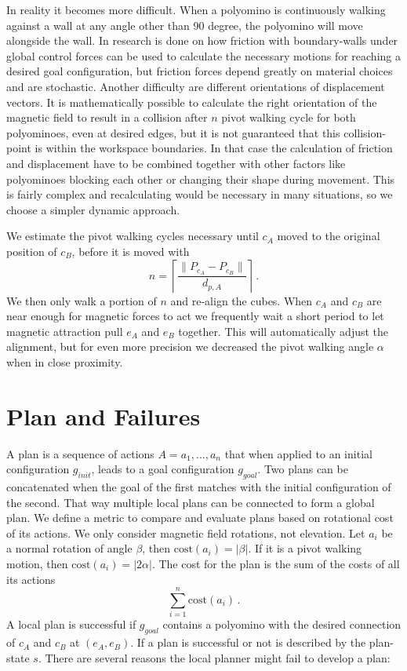 In reality it becomes more difficult.
When a polyomino is continuously walking against a wall at any angle other than 90 degree, the polyomino will move alongside the wall.
In \cite{schmidt2020} research is done on how friction with boundary-walls under global control forces can be used to calculate the necessary motions for reaching a desired goal configuration, but friction forces depend greatly on material choices and are stochastic.
Another difficulty are different orientations of displacement vectors.
It is mathematically possible to calculate the right orientation of the magnetic field to result in a collision after $n$ pivot walking cycle for both polyominoes, even at desired edges, but it is not guaranteed that this collision-point is within the workspace boundaries.
In that case the calculation of friction and displacement have to be combined together with other factors like polyominoes blocking each other or changing their shape during movement.
This is fairly complex and recalculating would be necessary in many situations, so we choose a simpler dynamic approach.

We estimate the pivot walking cycles necessary until $c_A$ moved to the original position of $c_B$, before it is moved with
\begin{equation}
n = \left\lceil \frac{\lVert P_{c_A} - P_{c_B}\rVert}{d_{p,A}} \right\rceil \,.
\end{equation}
We then only walk a portion of $n$ and re-align the cubes.
When $c_A$ and $c_B$ are near enough for magnetic forces to act we frequently wait a short period to let magnetic attraction pull $e_A$ and $e_B$ together.
This will automatically adjust the alignment, but for even more precision we decreased the pivot walking angle $\alpha$ when in close proximity.

\section{Plan and Failures}
\label{sec:plan}

A plan is a sequence of actions $A = a_1, ... , a_n$ that when applied to an initial configuration $g_{init}$, leads to a goal configuration $g_{goal}$.
Two plans can be concatenated when the goal of the first matches with the initial configuration of the second.
That way multiple local plans can be connected to form a global plan.
We define a metric to compare and evaluate plans based on rotational cost of its actions.
We only consider magnetic field rotations, not elevation.
Let $a_i$ be a normal rotation of angle $\beta$, then $\text{cost}(a_i) = |\beta|$.
If it is a pivot walking motion, then $\text{cost}(a_i) = |2\alpha|$.
The cost for the plan is the sum of the costs of all its actions
\begin{equation}
\sum_{i=1}^{n} \text{cost}(a_i) \,.
\end{equation}
A local plan is successful if $g_{goal}$ contains a polyomino with the desired connection of $c_A$ and $c_B$ at $(e_A, e_B)$.
If a plan is successful or not is described by the plan-state $s$.
There are several reasons the local planner might fail to develop a plan:

